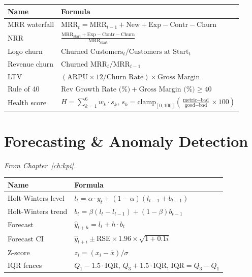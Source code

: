 \begin{tabularx}{\textwidth}{lX}
\toprule
\textbf{Name} & \textbf{Formula} \\
\midrule
MRR waterfall &
$\text{MRR}_t = \text{MRR}_{t-1} + \text{New} + \text{Exp} - \text{Contr} - \text{Churn}$ \\[8pt]

NRR &
$\displaystyle \frac{\text{MRR}_{\text{start}} + \text{Exp} - \text{Contr} - \text{Churn}}{\text{MRR}_{\text{start}}}$ \\[12pt]

Logo churn &
$\text{Churned Customers}_t / \text{Customers at Start}_t$ \\[8pt]

Revenue churn &
$\text{Churned MRR}_t / \text{MRR}_{t-1}$ \\[8pt]

LTV &
$(\text{ARPU} \times 12 / \text{Churn Rate}) \times \text{Gross Margin}$ \\[8pt]

Rule of 40 &
$\text{Rev Growth Rate (\%)} + \text{Gross Margin (\%)} \geq 40$ \\[8pt]

Health score &
$H = \sum_{k=1}^{6} w_k \cdot s_k$, \; $s_k = \text{clamp}_{[0,100]}\!\left(\frac{\text{metric} - \text{bad}}{\text{good} - \text{bad}} \times 100\right)$ \\
\bottomrule
\end{tabularx}

\section{Forecasting \& Anomaly Detection}

\noindent\textit{From Chapter~\ref{ch:kpi}.}

\medskip

\begin{tabularx}{\textwidth}{lX}
\toprule
\textbf{Name} & \textbf{Formula} \\
\midrule
Holt-Winters level &
$l_t = \alpha \cdot y_t + (1-\alpha)(l_{t-1} + b_{t-1})$ \\[8pt]

Holt-Winters trend &
$b_t = \beta(l_t - l_{t-1}) + (1-\beta)b_{t-1}$ \\[8pt]

Forecast &
$\hat{y}_{t+h} = l_t + h \cdot b_t$ \\[8pt]

Forecast CI &
$\hat{y}_{t+i} \pm \text{RSE} \times 1.96 \times \sqrt{1 + 0.1i}$ \\[8pt]

Z-score &
$z_i = (x_i - \bar{x}) / \sigma$ \\[8pt]

IQR fences &
$Q_1 - 1.5 \cdot \text{IQR}$, \; $Q_3 + 1.5 \cdot \text{IQR}$, \; $\text{IQR} = Q_3 - Q_1$ \\
\bottomrule
\end{tabularx}

